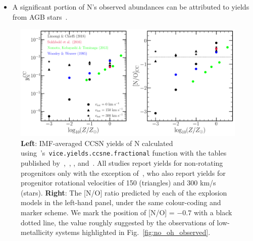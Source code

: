 \documentclass[ms.tex]{subfiles}
\begin{document}
\begin{itemize} 
	\item A significant portion of N's observed abundances can be attributed 
	to yields from AGB stars~\citep{Johnson2019}. 
\end{itemize} 

\begin{figure} 
\centering 
\includegraphics[scale = 0.5]{n_cc_yields.pdf} 
\caption{
\textbf{Left}: IMF-averaged CCSN yields of N calculated 
using~\vice's~\texttt{vice.yields.ccsne.fractional} function with the tables 
published by~\citet[][blue]{Woosley1995},~\citet*[][green]{Nomoto2013}, 
\citet[][red]{Sukhbold2016}, and~\citet[][black]{Limongi2018}. 
All studies report yields for non-rotating progenitors only with the exception 
of~\citet{Limongi2018}, who also report yields for progenitor rotational 
velocities of 150 (triangles) and 300 km/s (stars). 
\textbf{Right}: The [N/O] ratio predicted by each of the explosion models in 
the left-hand panel, under the same colour-coding and marker scheme. 
We mark the position of [N/O] = $-0.7$ with a black dotted line, the value 
roughly suggested by the observations of low-metallicity systems highlighted in 
Fig.~\ref{fig:no_oh_observed}. 
}
\label{fig:n_cc_yields} 
\end{figure} 
\end{document}
